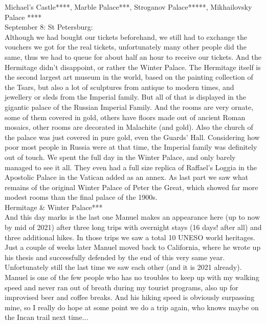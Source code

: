 Michael's Castle****, Marble Palace***, Stroganov Palace*****, Mikhailovsky Palace ****\\

September 8: St Petersburg:\\
Although we had bought our tickets beforehand, we still had to exchange the vouchers we got for the real tickets, unfortunately many other people did the same, thus we had to queue for about half an hour to receive our tickets. And the Hermitage didn't disappoint, or rather the Winter Palace. The Hermitage itself is the second largest art museum in the world, based on the painting collection of the Tsars, but also a lot of sculptures from antique to modern times, and jewellery or sleds from the Imperial family. But all of that is displayed in the gigantic palace of the Russian Imperial Family. And the rooms are very ornate, some of them covered in gold, others have floors made out of ancient Roman mosaics, other rooms are decorated in Malachite (and gold). Also the church of the palace was just covered in pure gold, even the Guards' Hall. Considering how poor most people in Russia were at that time, the Imperial family was definitely out of touch. We spent the full day in the Winter Palace, and only barely managed to see it all. They even had a full size replica of Raffael's Loggia in the Apostolic Palace in the Vatican added as an annex. As last part we saw what remains of the original Winter Palace of Peter the Great, which showed far more modest rooms than the final palace of the 1900s.\\

Hermitage \& Winter Palace***\\

And this day marks is the last one Manuel makes an appearance here (up to now by mid of 2021) after three long trips with overnight stays (16 days! after all) and three additional hikes. In those trips we saw a total 10 UNESO world heritages. Just a couple of weeks later Manuel moved back to California, where he wrote up his thesis and successfully defended by the end of this very same year. Unfortunately still the last time we saw each other (and it is 2021 already). Manuel is one of the few people who has no troubles to keep up with my walking speed and never ran out of breath during my tourist programs, also up for improvised beer and coffee breaks. And his hiking speed is obviously surpassing mine, so I really do hope at some point we do a trip again, who knows maybe on the Incan trail next time...\\


